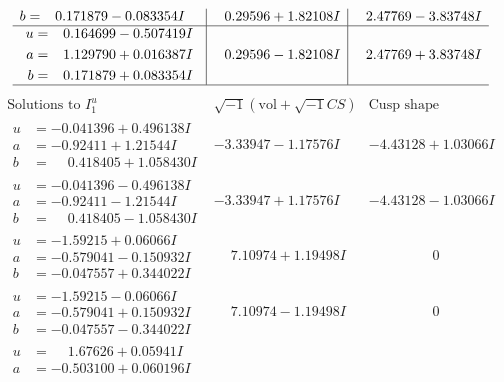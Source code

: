 \documentclass[1p]{elsarticle_modified}
\theoremstyle{definition}
\newcommand{\I}{\sqrt{-1}}
\begin{document}
$$\begin{array}{c|c|c}
\begin{aligned}
b &= \phantom{-}0.171879 - 0.083354 I\end{aligned}
 & \phantom{-}0.29596 + 1.82108 I & \phantom{-}2.47769 - 3.83748 I \\ \hline\begin{aligned}
u &= \phantom{-}0.164699 - 0.507419 I \\
a &= \phantom{-}1.129790 + 0.016387 I \\
b &= \phantom{-}0.171879 + 0.083354 I\end{aligned}
 & \phantom{-}0.29596 - 1.82108 I & \phantom{-}2.47769 + 3.83748 I\\
 \hline 
 \end{array}$$\newpage$$\begin{array}{c|c|c}  
\text{Solutions to }I^u_{1}& \I (\text{vol} + \sqrt{-1}CS) & \text{Cusp shape}\\
 \hline 
\begin{aligned}
u &= -0.041396 + 0.496138 I \\
a &= -0.92411 + 1.21544 I \\
b &= \phantom{-}0.418405 + 1.058430 I\end{aligned}
 & -3.33947 - 1.17576 I & -4.43128 + 1.03066 I \\ \hline\begin{aligned}
u &= -0.041396 - 0.496138 I \\
a &= -0.92411 - 1.21544 I \\
b &= \phantom{-}0.418405 - 1.058430 I\end{aligned}
 & -3.33947 + 1.17576 I & -4.43128 - 1.03066 I \\ \hline\begin{aligned}
u &= -1.59215 + 0.06066 I \\
a &= -0.579041 - 0.150932 I \\
b &= -0.047557 + 0.344022 I\end{aligned}
 & \phantom{-}7.10974 + 1.19498 I & \phantom{-0.000000 } 0 \\ \hline\begin{aligned}
u &= -1.59215 - 0.06066 I \\
a &= -0.579041 + 0.150932 I \\
b &= -0.047557 - 0.344022 I\end{aligned}
 & \phantom{-}7.10974 - 1.19498 I & \phantom{-0.000000 } 0 \\ \hline\begin{aligned}
u &= \phantom{-}1.67626 + 0.05941 I \\
a &= -0.503100 + 0.060196 I \\

\end{aligned}
\end{array}$$
\end{document}
